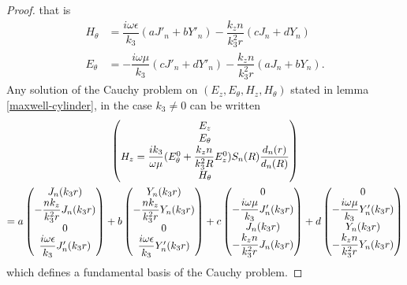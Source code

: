 \documentclass[12pt,%
    twoside,%
    a4paper,%
    openright, %
    ]{book}
\numberwithin{equation}{section} %
\renewcommand{\frac}[2]{\dfrac{#1}{#2}} %
\begin{document}
\begin{proof}
            that is
            \begin{equation}
                \label{HthetaEtheta}
                \begin{aligned}
                H_{\theta}&=\frac{i\omega \epsilon}{k_3}(aJ'_n+bY'_n)-\frac{k_zn}{k_3^2r}( cJ_n+dY_n)
                \\
                 E_{\theta}&=-\frac{i\omega \mu}{k_3} (cJ'_n+dY'_n)-\frac{k_zn}{k_3^2r}( aJ_n+bY_n).
                \end{aligned}
            \end{equation}
            Any solution of the Cauchy problem on $ (E_z,E_{\theta},H_z,H_{\theta})$ stated in lemma \ref{maxwell-cylinder}, in the case $k_3\not=0$ can be written
            \begin{multline*}
                \begin{pmatrix}
                    E_z
                    \cr
                    E_{\theta}
                    \cr
                    H_z=\frac{ik_3}{\omega \mu}(E_{\theta}^0+\frac{k_zn}{k_3^2R}E_z^0)S_n(R)\frac{d_n(r)}{d_n(R)}
                    \cr
                    H_{\theta}
                \end{pmatrix}
                \\
                =
                a\begin{pmatrix}
                    J_n(k_3r)
                    \cr
                    -\frac{nk_z}{k_3^2r}J_n(k_3r)
                    \cr
                    0
                    \cr
                    \frac{i\omega \epsilon}{k_3}J'_n(k_3r)
                \end{pmatrix}
                +b\begin{pmatrix}
                    Y_n(k_3r)
                    \cr
                    -\frac{nk_z}{k_3^2r}Y_n(k_3r)
                    \cr
                    0
                    \cr
                    \frac{i\omega \epsilon}{k_3}Y'_n(k_3r)
                \end{pmatrix}
                +c\begin{pmatrix}
                    0
                    \cr
                    -\frac{i\omega \mu}{k_3}J'_n(k_3r)
                    \cr
                    J_n(k_3r)
                    \cr
                    -\frac{k_zn}{k_3^2r}J_n(k_3r)
                \end{pmatrix}
                +d
                \begin{pmatrix}
                    0
                    \cr
                    -\frac{i\omega \mu}{k_3}Y'_n(k_3r)
                    \cr
                    Y_n(k_3r)
                    \cr
                    -\frac{k_zn}{k_3^2r}Y_n(k_3r)
                \end{pmatrix}
            \end{multline*}
            which defines a fundamental basis of the Cauchy problem.


\end{proof}
\end{document}
